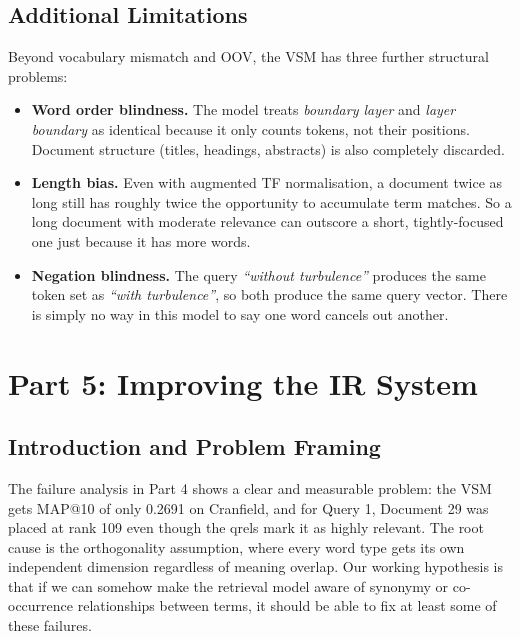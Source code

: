 \documentclass{svproc}
\begin{document}
    \subsection{Additional Limitations}

    Beyond vocabulary mismatch and OOV, the VSM has three further structural problems:

    \begin{itemize}[noitemsep]
        \item \textbf{Word order blindness.} The model treats \textit{boundary layer} and \textit{layer boundary} as identical because it only counts tokens, not their positions. Document structure (titles, headings, abstracts) is also completely discarded.
        \item \textbf{Length bias.} Even with augmented TF normalisation, a document twice as long still has roughly twice the opportunity to accumulate term matches. So a long document with moderate relevance can outscore a short, tightly-focused one just because it has more words.
        \item \textbf{Negation blindness.} The query \textit{``without turbulence''} produces the same token set as \textit{``with turbulence''}, so both produce the same query vector. There is simply no way in this model to say one word cancels out another.
    \end{itemize}

    \FloatBarrier
    \section{Part 5: Improving the IR System}

    \subsection{Introduction and Problem Framing}

    The failure analysis in Part 4 shows a clear and measurable problem: the VSM gets MAP@10 of only 0.2691 on Cranfield, and for Query 1, Document 29 was placed at rank 109 even though the qrels mark it as highly relevant. The root cause is the orthogonality assumption, where every word type gets its own independent dimension regardless of meaning overlap. Our working hypothesis is that if we can somehow make the retrieval model aware of synonymy or co-occurrence relationships between terms, it should be able to fix at least some of these failures.
\end{document}
